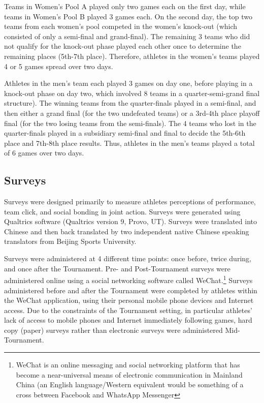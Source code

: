 \begin{CJK}{UTF8}{gbsn}
Teams in Women's Pool A played only two games each on the first day, while teams in Women's Pool B played 3 games each. On the second day, the top two teams from each women's pool competed in the women's knock-out (which consisted of only a semi-final and grand-final).  The remaining 3 teams who did not qualify for the knock-out phase played each other once to determine the remaining places (5th-7th place).  Therefore, athletes in the women's teams played 4 or 5 games spread over two days.

Athletes in the men's team each played 3 games on day one, before playing in a knock-out phase on day two, which involved 8 teams in a quarter-semi-grand final structure). The winning teams from the quarter-finals played in a semi-final, and then either a grand final (for the two undefeated teams) or a 3rd-4th place playoff final (for the two losing teams from the semi-finals). The 4 teams who lost in the quarter-finals played in a subsidiary semi-final and final to decide the 5th-6th place and 7th-8th place results. Thus, athletes in the men's teams played a total of 6 games over two days.




\subsection{Surveys}
Surveys were designed primarily to measure athletes perceptions of performance, team click, and social bonding in joint action.  Surveys were generated using Qualtrics software (Qualtrics version 9, Provo, UT). Surveys were translated into Chinese and then back translated by two independent native Chinese speaking translators from Beijing Sports University.

Surveys were administered at 4 different time points: once before, twice during, and once after the Tournament.  Pre- and Post-Tournament surveys were administered online using a social networking software called WeChat.\footnote{WeChat is an online messaging and social networking platform that has become a near-universal means of electronic communication in Mainland China (an English language/Western equivalent would be something of a cross between Facebook and WhatsApp Messenger} Surveys administered before and after the Tournament were completed by athletes within the WeChat application, using their personal mobile phone devices and Internet access.  Due to the constraints of the Tournament setting, in particular athletes' lack of access to mobile phones and Internet immediately following games, hard copy (paper) surveys rather than electronic surveys were administered Mid-Tournament.



\end{CJK}
